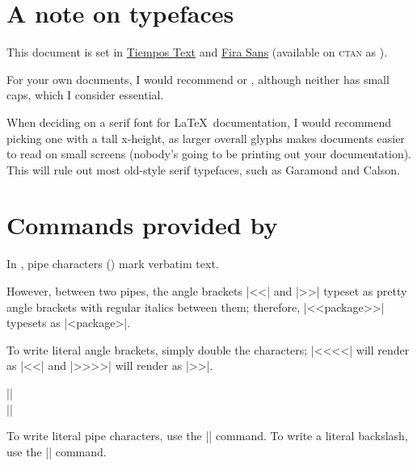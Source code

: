 \documentclass{ltxguidex}
\newcommand{\ltxguide}{\ltxclass{ltxguide}}
\begin{document}
\section{A note on typefaces}

This document is set in
\href{https://klim.co.nz/retail-fonts/tiempos-text/}{Tiempos Text} and
\href{https://bboxtype.com/typefaces/FiraSans/}{Fira Sans} (available on
\textsc{ctan} as ).

For your own documents, I would recommend  or ,
although neither has small caps, which I consider essential.

When deciding on a serif font for \LaTeX\ documentation, I would recommend
picking one with a tall x-height, as larger overall glyphs makes documents
easier to read on small screens (nobody's going to be printing out your
documentation). This will rule out most old-style serif typefaces, such as
Garamond and Calson.

\section{Commands provided by \ltxguide}

In \ltxguide, pipe characters (\texttt{\pipe}) mark verbatim text.

However, between two pipes, the angle brackets |<<| and |>>| typeset as
pretty angle brackets with regular italics between them; therefore,
\texttt{\pipe}|<<package>>|\texttt{\pipe} typesets as |<package>|.

To write literal angle brackets, simply double the characters;
\texttt{\pipe}|<<<<|\texttt{\pipe} will render as |<<|  and
\texttt{\pipe}|>>>>|\texttt{\pipe} will render as |>>|.

\begin{desc}
|\pipe|\\
|\bs|
\end{desc}
To write literal pipe characters, use the |\pipe| command. To write a
literal backslash, use the |\bs| command.

\begin{LTXexample}
\pipe \\
\texttt{\pipe} \\
\textit{\pipe} \\
\textbf{\texttt{\pipe}} \\
\bs \\
\texttt{\bs} \\
\textit{\bs} \\
\textbf{\texttt{\bs}}
\end{LTXexample}
\end{document}
